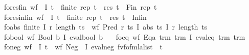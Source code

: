 \begin{isabellebody}
\ \ \ fo{\isacharunderscore}{\kern0pt}res{\isacharunderscore}{\kern0pt}fin{\isacharcolon}{\kern0pt}\ {\isachardoublequoteopen}wf\ {\isasymphi}\ I\ t\ {\isasymLongrightarrow}\ finite\ {\isacharparenleft}{\kern0pt}rep\ t{\isacharparenright}{\kern0pt}\ {\isasymLongrightarrow}\ res\ t\ {\isacharequal}{\kern0pt}\ Fin\ {\isacharparenleft}{\kern0pt}rep\ t{\isacharparenright}{\kern0pt}{\isachardoublequoteclose}\isanewline
\ \ \ fo{\isacharunderscore}{\kern0pt}res{\isacharunderscore}{\kern0pt}infin{\isacharcolon}{\kern0pt}\ {\isachardoublequoteopen}wf\ {\isasymphi}\ I\ t\ {\isasymLongrightarrow}\ {\isasymnot}finite\ {\isacharparenleft}{\kern0pt}rep\ t{\isacharparenright}{\kern0pt}\ {\isasymLongrightarrow}\ res\ t\ {\isacharequal}{\kern0pt}\ Infin{\isachardoublequoteclose}\isanewline
\ \ \ fo{\isacharunderscore}{\kern0pt}abs{\isacharcolon}{\kern0pt}\ {\isachardoublequoteopen}finite\ {\isacharparenleft}{\kern0pt}I\ {\isacharparenleft}{\kern0pt}r{\isacharcomma}{\kern0pt}\ length\ ts{\isacharparenright}{\kern0pt}{\isacharparenright}{\kern0pt}\ {\isasymLongrightarrow}\ wf\ {\isacharparenleft}{\kern0pt}Pred\ r\ ts{\isacharparenright}{\kern0pt}\ I\ {\isacharparenleft}{\kern0pt}abs\ ts\ {\isacharparenleft}{\kern0pt}I\ {\isacharparenleft}{\kern0pt}r{\isacharcomma}{\kern0pt}\ length\ ts{\isacharparenright}{\kern0pt}{\isacharparenright}{\kern0pt}{\isacharparenright}{\kern0pt}{\isachardoublequoteclose}\isanewline
\ \ \ fo{\isacharunderscore}{\kern0pt}bool{\isacharcolon}{\kern0pt}\ {\isachardoublequoteopen}wf\ {\isacharparenleft}{\kern0pt}Bool\ b{\isacharparenright}{\kern0pt}\ I\ {\isacharparenleft}{\kern0pt}eval{\isacharunderscore}{\kern0pt}bool\ b{\isacharparenright}{\kern0pt}{\isachardoublequoteclose}\isanewline
\ \ \ fo{\isacharunderscore}{\kern0pt}eq{\isacharcolon}{\kern0pt}\ {\isachardoublequoteopen}wf\ {\isacharparenleft}{\kern0pt}Eqa\ trm\ trm{\isacharprime}{\kern0pt}{\isacharparenright}{\kern0pt}\ I\ {\isacharparenleft}{\kern0pt}eval{\isacharunderscore}{\kern0pt}eq\ trm\ trm{\isacharprime}{\kern0pt}{\isacharparenright}{\kern0pt}{\isachardoublequoteclose}\isanewline
\ \ \ fo{\isacharunderscore}{\kern0pt}neg{\isacharcolon}{\kern0pt}\ {\isachardoublequoteopen}wf\ {\isasymphi}\ I\ t\ {\isasymLongrightarrow}\ wf\ {\isacharparenleft}{\kern0pt}Neg\ {\isasymphi}{\isacharparenright}{\kern0pt}\ I\ {\isacharparenleft}{\kern0pt}eval{\isacharunderscore}{\kern0pt}neg\ {\isacharparenleft}{\kern0pt}fv{\isacharunderscore}{\kern0pt}fo{\isacharunderscore}{\kern0pt}fmla{\isacharunderscore}{\kern0pt}list\ {\isasymphi}{\isacharparenright}{\kern0pt}\ t{\isacharparenright}{\kern0pt}{\isachardoublequoteclose}\isanewline

\end{isabellebody}
